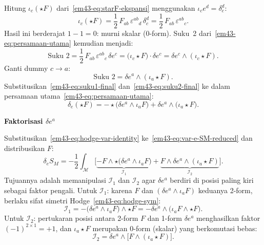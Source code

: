 Hitung $\iota_{c}(\star F)$ dari~\eqref{em43-eq:starF-ekspansi} menggunakan $\iota_{c} e^{d} = \delta_{c}^{d}$:
\begin{equation}\label{em43-eq:interior-starF}
    \iota_{c}(\star F)
    = \frac{1}{2}\, F_{ab}\, \varepsilon^{ab}{}_{d}\, \delta_{c}^{d}
    = \frac{1}{2}\, F_{ab}\, \varepsilon^{ab}{}_{c}.
\end{equation}
Hasil ini berderajat $1 - 1 = 0$: murni skalar (0-form). Suku~2 dari~\eqref{em43-eq:persamaan-utama} kemudian menjadi:
\begin{equation}
    \text{Suku 2}
    = \frac{1}{2}\, F_{ab}\, \varepsilon^{ab}{}_{c}\, \delta e^{c}
    = \big(\iota_{c}\star F\big) \cdot \delta e^{c}
    = \delta e^{c} \wedge (\iota_{c}\star F).
\end{equation}
Ganti dummy $c \to a$:
\begin{equation}\label{em43-eq:suku2-final}
    \text{Suku 2} = \delta e^{a} \wedge (\iota_{a}\star F).
\end{equation}
Substitusikan~\eqref{em43-eq:suku1-final} dan~\eqref{em43-eq:suku2-final} ke dalam persamaan utama~\eqref{em43-eq:persamaan-utama}:
\begin{equation}\label{em43-eq:hodge-var-identity}
    \delta_{e}(\star F)
    = -\star\!\big(\delta e^{a} \wedge \iota_{a} F\big)
    + \delta e^{a} \wedge \big(\iota_{a}\star F\big).
\end{equation}

\vspace{0.5em}
\noindent \textbf{Faktorisasi $\delta e^a$}

Substitusikan~\eqref{em43-eq:hodge-var-identity} ke~\eqref{em43-eq:var-e-SM-reduced} dan distribusikan $F$:
\begin{equation}\label{em43-eq:I1-I2-def}
    \delta_{e} S_{M}
    = -\frac{1}{2} \int_{\mathcal{M}}
    \bigg[\underbrace{-F \wedge \star\!\big(\delta e^{a}
    \wedge \iota_{a} F\big)}_{\mathcal{I}_{1}}
    + \underbrace{F \wedge \delta e^{a}
    \wedge (\iota_{a}\star F)}_{\mathcal{I}_{2}}\bigg].
\end{equation}
Tujuannya adalah memanipulasi $\mathcal{I}_{1}$ dan $\mathcal{I}_{2}$ agar $\delta e^{a}$ berdiri di posisi paling kiri sebagai faktor pengali.
Untuk $\mathcal{I}_{1}$: karena $F$ dan $(\delta e^{a} \wedge \iota_{a} F)$ keduanya 2-form, berlaku sifat simetri Hodge~\eqref{em43-eq:hodge-sym}:
\begin{equation}\label{em43-eq:I1-result}
    \mathcal{I}_{1}
    = -\big(\delta e^{a} \wedge \iota_{a} F\big) \wedge \star F
    = -\delta e^{a} \wedge \big(\iota_{a} F \wedge \star F\big).
\end{equation}
Untuk $\mathcal{I}_{2}$: pertukaran posisi antara 2-form $F$ dan 1-form $\delta e^{a}$ menghasilkan faktor $(-1)^{2 \times 1} = +1$, dan $\iota_{a}\star F$ merupakan 0-form (skalar) yang berkomutasi bebas:
\begin{equation}\label{em43-eq:I2-result}
    \mathcal{I}_{2}
    = \delta e^{a} \wedge \big[F \wedge (\iota_{a}\star F)\big].
\end{equation}

